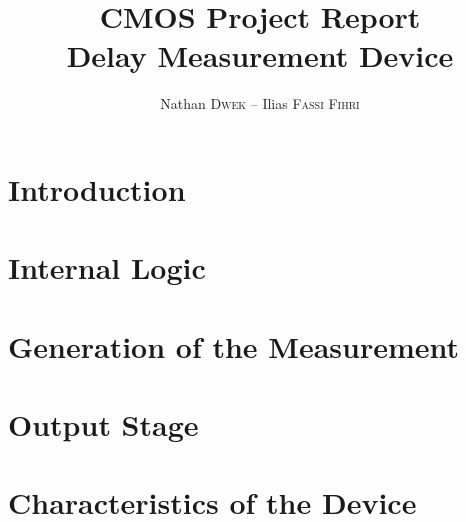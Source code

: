 
\title{CMOS Project Report\\Delay Measurement Device}
\author{Nathan \textsc{Dwek} -- Ilias \textsc{Fassi Fihri}}


\maketitle
\tableofcontents
\clearpage
\hypersetup{allcolors=link}
\section{Introduction}


\section{Internal Logic}


\section{Generation of the Measurement}


\section{Output Stage}


\section{Characteristics of the Device}



